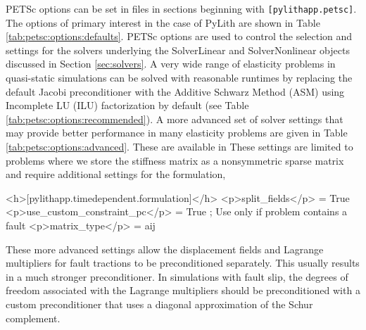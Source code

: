 PETSc options can be set in  files in sections
beginning with \texttt{[pylithapp.petsc]}. The options of primary
interest in the case of PyLith are shown in Table
\vref{tab:petsc:options:defaults}.  PETSc options are used to control
the selection and settings for the solvers underlying the SolverLinear
and SolverNonlinear objects discussed in Section \vref{sec:solvers}. A
very wide range of elasticity problems in quasi-static simulations can
be solved with reasonable runtimes by replacing the default Jacobi
preconditioner with the Additive Schwarz Method (ASM) using Incomplete
LU (ILU) factorization by default (see Table
\vref{tab:petsc:options:recommended}). A more advanced set of solver
settings that may provide better performance in many elasticity
problems are given in Table \vref{tab:petsc:options:advanced}. These
are available in
These settings are limited to problems where we store the stiffness
matrix as a nonsymmetric sparse matrix and require additional settings
for the formulation,
\begin{cfg}
<h>[pylithapp.timedependent.formulation]</h>
<p>split_fields</p> = True
<p>use_custom_constraint_pc</p> = True ; Use only if problem contains a fault
<p>matrix_type</p> = aij
\end{cfg}



These more advanced settings allow the displacement fields and Lagrange
multipliers for fault tractions to be preconditioned separately. This
usually results in a much stronger preconditioner. In simulations
with fault slip, the degrees of freedom associated with the Lagrange
multipliers should be preconditioned with a custom preconditioner
that uses a diagonal approximation of the Schur complement.

